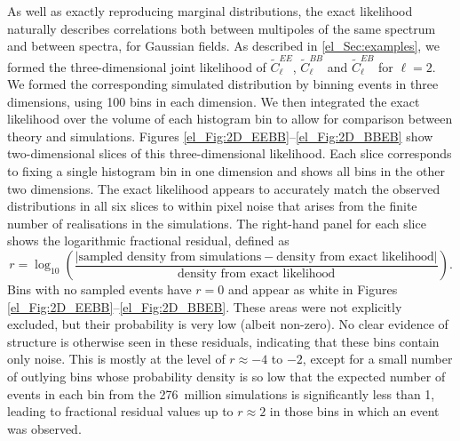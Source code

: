 As well as exactly reproducing marginal distributions, the exact likelihood naturally describes correlations both between multipoles of the same spectrum and between spectra, for Gaussian fields. As described in \autoref{el_Sec:examples}, we formed the three-dimensional joint likelihood of $\widetilde{C}_\ell^{EE}$, $\widetilde{C}_\ell^{BB}$ and $\widetilde{C}_\ell^{EB}$ for $\ell = 2$. We formed the corresponding simulated distribution by binning events in three dimensions, using 100 bins in each dimension. We then integrated the exact likelihood over the volume of each histogram bin to allow for comparison between theory and simulations. Figures \ref{el_Fig:2D_EEBB}--\ref{el_Fig:2D_BBEB} show two-dimensional slices of this three-dimensional likelihood. Each slice corresponds to fixing a single histogram bin in one dimension and shows all bins in the other two dimensions. The exact likelihood appears to accurately match the observed distributions in all six slices to within pixel noise that arises from the finite number of realisations in the simulations. The right-hand panel for each slice shows the logarithmic fractional residual, defined as
\begin{equation}
    r = \log_{10} \left(
    \frac{\big\lvert
    \text{sampled density from simulations}
    - \text{density from exact likelihood}
    \big\rvert}{\text{density from exact likelihood}}
    \right).
    \label{el_Eqn:resid_def}
\end{equation}
Bins with no sampled events have $r = 0$ and appear as white in Figures \ref{el_Fig:2D_EEBB}--\ref{el_Fig:2D_BBEB}. These areas were not explicitly excluded, but their probability is very low (albeit non-zero). No clear evidence of structure is otherwise seen in these residuals, indicating that these bins contain only noise. This is mostly at the level of $r \approx -4$ to $-2$, except for a small number of outlying bins whose probability density is so low that the expected number of events in each bin from the 276~million simulations is significantly less than 1, leading to fractional residual values up to $r \approx 2$ in those bins in which an event was observed.

